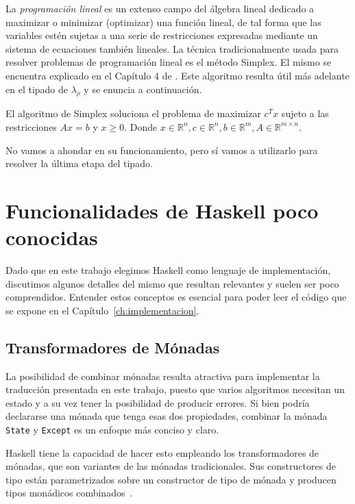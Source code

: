 La \emph{programación lineal} es un extenso campo del álgebra lineal dedicado a maximizar o minimizar (optimizar) una función lineal, de tal forma que las variables estén sujetas a una serie de restricciones expresadas mediante un sistema de ecuaciones también lineales. La técnica tradicionalmente usada para resolver problemas de programación lineal es el método Simplex. El mismo se encuentra explicado en el Capítulo 4 de \cite{simplex}. Este algoritmo resulta útil más adelante en el tipado de $\lambda_\rho$ y se enuncia a continuación.

\begin{definicion}\label{def:simplex}
    El algoritmo de Simplex soluciona el problema de maximizar $c^T x$ sujeto a las restricciones $Ax=b$ y $x\geq 0$. Donde $x\in \mathbb{R}^n, c\in \mathbb{R}^n, b\in \mathbb{R}^m, A\in \mathbb{R}^{m\times n}$.
\end{definicion}

No vamos a ahondar en su funcionamiento, pero sí vamos a utilizarlo para resolver la última etapa del tipado.

\section{Funcionalidades de Haskell poco conocidas}

Dado que en este trabajo elegimos Haskell como lenguaje de implementación, discutimos algunos detalles del mismo que resultan relevantes y suelen ser poco comprendidos. Entender estos conceptos es esencial para poder leer el código que se expone en el Capítulo~\ref{ch:implementacion}.

\subsection{Transformadores de Mónadas}
La posibilidad de combinar mónadas resulta atractiva para implementar la traducción presentada en este trabajo, puesto que varios algoritmos necesitan un estado y a su vez tener la posibilidad de producir errores. Si bien podría declararse una mónada que tenga esas dos propiedades, combinar la mónada \texttt{State} y \texttt{Except} es un enfoque más conciso y claro.

Haskell tiene la capacidad de hacer esto empleando los transformadores de mónadas, que son variantes de las mónadas tradicionales. Sus constructores de tipo están parametrizados sobre un constructor de tipo de mónada y producen tipos monádicos combinados~\cite{monads}.

